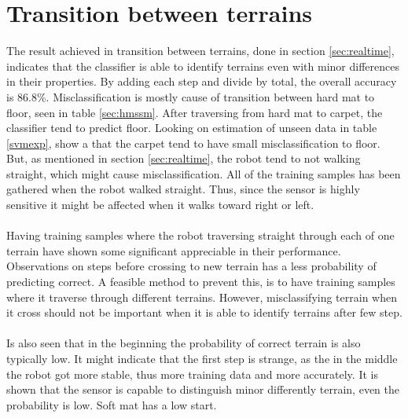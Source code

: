 \documentclass[USenglish]{ifimaster}  %
\begin{document}
\section{Transition between terrains}
The result achieved in transition between terrains, done in section \ref{sec:realtime}, indicates that the classifier is able to identify terrains even with minor differences in their properties. By adding each step and divide by total, the overall accuracy is  86.8\%. Misclassification is mostly cause of transition between hard mat to floor, seen in table \ref{sec:hmssm}. After traversing from hard mat to carpet, the classifier tend to predict floor. Looking on estimation of unseen data in table \ref{svmexp}, show a that the carpet tend to have small misclassification to floor. But, as mentioned in section \ref{sec:realtime}, the robot tend to not walking straight, which might cause misclassification. All of the training samples has been gathered when the robot walked straight. Thus, since the sensor is highly sensitive it might be affected when it walks toward right or left.
\\
\\
Having training samples where the robot traversing straight through each of one terrain have shown some significant appreciable in their performance. Observations on steps before crossing to new terrain has a less probability of predicting correct. A feasible method to prevent this, is to have training samples where it traverse through different terrains. However, misclassifying terrain when it cross should not be important when it is able to identify terrains after few step.    
\\
\\
Is also seen that in the beginning the probability of correct terrain is also typically low. It might indicate that the first step is strange, as the in the middle the robot got more stable, thus more training data and more accurately. It is shown that the sensor is capable to distinguish minor differently terrain, even the probability is low. Soft mat has a low start.
\end{document}
